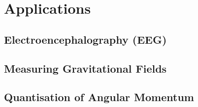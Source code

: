 
\section{Applications}

\subsection{Electroencephalography (EEG)}

\subsection{Measuring Gravitational Fields}

\subsection{Quantisation of Angular Momentum}
